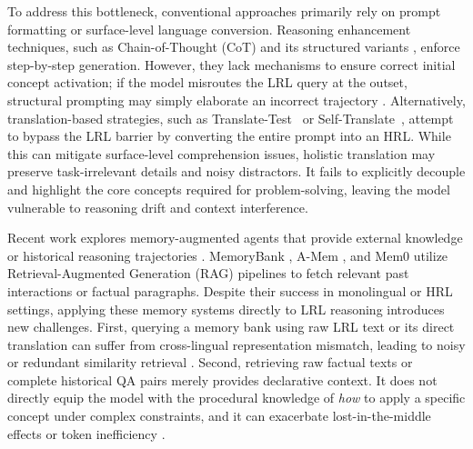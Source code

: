 \documentclass[11pt]{article}
\begin{document}
To address this bottleneck, conventional approaches primarily rely on prompt formatting or surface-level language conversion.
Reasoning enhancement techniques, such as Chain-of-Thought (CoT) \citep{wei2022chain} and its structured variants \citep{qi2025sot}, enforce step-by-step generation.
However, they lack mechanisms to ensure correct initial concept activation; if the model misroutes the LRL query at the outset, structural prompting may simply elaborate an incorrect trajectory \citep{chen2025halumem}.
Alternatively, translation-based strategies, such as Translate-Test~\citep{etxaniz2024multilingual} or Self-Translate~\citep{liu2025translation}, attempt to bypass the LRL barrier by converting the entire prompt into an HRL.
While this can mitigate surface-level comprehension issues, holistic translation may preserve task-irrelevant details and noisy distractors.
It fails to explicitly decouple and highlight the core concepts required for problem-solving, leaving the model vulnerable to reasoning drift and context interference.

Recent work explores memory-augmented agents that provide external knowledge or historical reasoning trajectories \citep{liu2025agent0,zhang2026g}.
MemoryBank \citep{zhong2024memorybank}, A-Mem \citep{xu2026mem}, and Mem0 \citep{chhikara2025mem0} utilize Retrieval-Augmented Generation (RAG) pipelines to fetch relevant past interactions or factual paragraphs.
Despite their success in monolingual or HRL settings, applying these memory systems directly to LRL reasoning introduces new challenges.
First, querying a memory bank using raw LRL text or its direct translation can suffer from cross-lingual representation mismatch, leading to noisy or redundant similarity retrieval \citep{hu2026beyond}.
Second, retrieving raw factual texts or complete historical QA pairs merely provides declarative context.
It does not directly equip the model with the procedural knowledge of \textit{how} to apply a specific concept under complex constraints, and it can exacerbate lost-in-the-middle effects or token inefficiency \citep{liu2026simplemem}.
\end{document}

